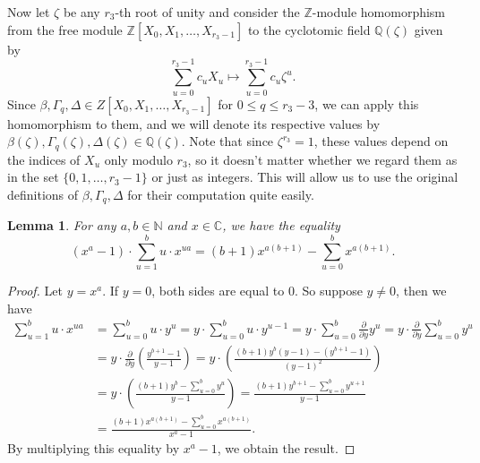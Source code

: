 \documentclass[12pt,a4paper]{article}
\newtheorem{lemma}[theorem]{Lemma}
\theoremstyle{definition}
\newcommand{\Nbb}{\mathbb{N}}
\newcommand{\C}{\mathbb{C}}
\newcommand{\Q}{\mathbb{Q}}
\newcommand{\Z}{\mathbb{Z}}
\newcommand{\z}{\zeta}
\begin{document}
Now let $\z$ be any $r_3$-th root of unity and consider the $\Z$-module homomorphism from the free module $\Z[X_0,X_1,\dots,X_{r_3-1}]$ to the cyclotomic field $\Q(\z)$ given by $$\sum_{u=0}^{r_3-1}c_u X_u\mapsto \sum_{u=0}^{r_3-1}c_u \z^u.$$ Since $\beta,\Gamma_q,\Delta \in Z[X_0,X_1,\dots,X_{r_3-1}]$ for $0\leq q\leq r_3-3$, we can apply this homomorphism to them, and we will denote its respective values by $\beta(\z),\Gamma_q(\z),\Delta(\z)\in\Q(\z)$. Note that since $\z^{r_3}=1$, these values depend on the indices of $X_u$ only modulo $r_3$, so it doesn't matter whether we regard them as in the set $\{0,1,\dots,r_3-1\}$ or just as integers. This will allow us to use the original definitions of $\beta,\Gamma_q,\Delta$ for their computation quite easily.

\begin{lemma}\label{argeo}
For any $a,b\in\Nbb$ and $x\in\C$, we have the equality
$$(x^a-1)\cdot\sum_{u=1}^{b}u\cdot x^{ua}=(b+1)x^{a(b+1)}-\sum_{u=0}^b x^{a(b+1)}.$$
\end{lemma}
\begin{proof}
Let $y=x^a$. If $y=0$, both sides are equal to $0$. So suppose $y\neq 0$, then we have 
\begin{align*}
\sum_{u=1}^{b}u\cdot x^{ua}&=\sum_{u=0}^{b}u\cdot y^{u}=y\cdot \sum_{u=0}^{b}u\cdot y^{u-1}=y\cdot \sum_{u=0}^{b}\frac{\partial}{\partial y} y^u=y\cdot \frac{\partial}{\partial y}\sum_{u=0}^{b} y^u\\
&=y\cdot \frac{\partial}{\partial y} \left(\frac{y^{b+1}-1}{y-1}\right)=y\cdot \left(\frac{(b+1)y^{b}(y-1)-(y^{b+1}-1)}{(y-1)^2}\right)\\
&=y\cdot \left(\frac{(b+1)y^{b}-\sum_{u=0}^b y^u}{y-1}\right)=\frac{(b+1)y^{b+1}-\sum_{u=0}^b y^{u+1}}{y-1}\\
&=\frac{(b+1)x^{a(b+1)}-\sum_{u=0}^b x^{a(b+1)}}{x^a-1}.
\end{align*}
By multiplying this equality by $x^a-1$, we obtain the result.
\end{proof}
\end{document}
